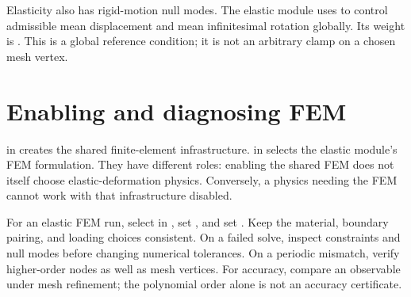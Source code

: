 Elasticity also has rigid-motion null modes. The elastic module uses  to control admissible mean displacement and mean infinitesimal rotation globally. Its weight is . This is a global reference condition; it is not an arbitrary clamp on a chosen mesh vertex.

\section{Enabling and diagnosing FEM}
 in  creates the shared finite-element infrastructure.  in  selects the elastic module's FEM formulation. They have different roles: enabling the shared FEM does not itself choose elastic-deformation physics. Conversely, a physics needing the FEM cannot work with that infrastructure disabled.

For an elastic FEM run, select  in , set , and set . Keep the material, boundary pairing, and loading choices consistent. On a failed solve, inspect constraints and null modes before changing numerical tolerances. On a periodic mismatch, verify higher-order nodes as well as mesh vertices. For accuracy, compare an observable under mesh refinement; the polynomial order alone is not an accuracy certificate.
